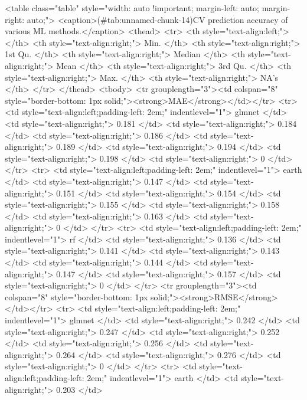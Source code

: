 \begin{Schunk}
<table class="table" style="width: auto !important; margin-left: auto; margin-right: auto;">
<caption>(\#tab:unnamed-chunk-14)CV prediction accuracy of various ML methods.</caption>
 <thead>
  <tr>
   <th style="text-align:left;">   </th>
   <th style="text-align:right;"> Min. </th>
   <th style="text-align:right;"> 1st Qu. </th>
   <th style="text-align:right;"> Median </th>
   <th style="text-align:right;"> Mean </th>
   <th style="text-align:right;"> 3rd Qu. </th>
   <th style="text-align:right;"> Max. </th>
   <th style="text-align:right;"> NA's </th>
  </tr>
 </thead>
<tbody>
  <tr grouplength="3"><td colspan="8" style="border-bottom: 1px solid;"><strong>MAE</strong></td></tr>
<tr>
   <td style="text-align:left;padding-left: 2em;" indentlevel="1"> glmnet </td>
   <td style="text-align:right;"> 0.181 </td>
   <td style="text-align:right;"> 0.184 </td>
   <td style="text-align:right;"> 0.186 </td>
   <td style="text-align:right;"> 0.189 </td>
   <td style="text-align:right;"> 0.194 </td>
   <td style="text-align:right;"> 0.198 </td>
   <td style="text-align:right;"> 0 </td>
  </tr>
  <tr>
   <td style="text-align:left;padding-left: 2em;" indentlevel="1"> earth </td>
   <td style="text-align:right;"> 0.147 </td>
   <td style="text-align:right;"> 0.151 </td>
   <td style="text-align:right;"> 0.154 </td>
   <td style="text-align:right;"> 0.155 </td>
   <td style="text-align:right;"> 0.158 </td>
   <td style="text-align:right;"> 0.163 </td>
   <td style="text-align:right;"> 0 </td>
  </tr>
  <tr>
   <td style="text-align:left;padding-left: 2em;" indentlevel="1"> rf </td>
   <td style="text-align:right;"> 0.136 </td>
   <td style="text-align:right;"> 0.141 </td>
   <td style="text-align:right;"> 0.143 </td>
   <td style="text-align:right;"> 0.144 </td>
   <td style="text-align:right;"> 0.147 </td>
   <td style="text-align:right;"> 0.157 </td>
   <td style="text-align:right;"> 0 </td>
  </tr>
  <tr grouplength="3"><td colspan="8" style="border-bottom: 1px solid;"><strong>RMSE</strong></td></tr>
<tr>
   <td style="text-align:left;padding-left: 2em;" indentlevel="1"> glmnet </td>
   <td style="text-align:right;"> 0.242 </td>
   <td style="text-align:right;"> 0.247 </td>
   <td style="text-align:right;"> 0.252 </td>
   <td style="text-align:right;"> 0.256 </td>
   <td style="text-align:right;"> 0.264 </td>
   <td style="text-align:right;"> 0.276 </td>
   <td style="text-align:right;"> 0 </td>
  </tr>
  <tr>
   <td style="text-align:left;padding-left: 2em;" indentlevel="1"> earth </td>
   <td style="text-align:right;"> 0.203 </td>

\end{Schunk}
